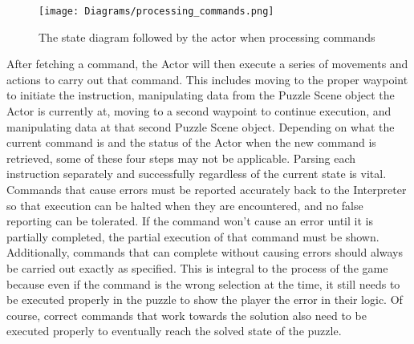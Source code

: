 \begin{figure}[!htb]
  \caption{The state diagram followed by the actor when processing commands}
  \label{fig:processing_commands}
  \centering
  \texttt{[image: Diagrams/processing\_commands.png]}
\end{figure}

After fetching a command, the Actor will then execute a series of movements and actions to carry out that command. This includes moving to the proper waypoint to initiate the instruction, manipulating data from the Puzzle Scene object the Actor is currently at, moving to a second waypoint to continue execution, and manipulating data at that second Puzzle Scene object. Depending on what the current command is and the status of the Actor when the new command is retrieved, some of these four steps may not be applicable. Parsing each instruction separately and successfully regardless of the current state is vital. Commands that cause errors must be reported accurately back to the Interpreter so that execution can be halted when they are encountered, and no false reporting can be tolerated. If the command won't cause an error until it is partially completed, the partial execution of that command must be shown. Additionally, commands that can complete without causing errors should always be carried out exactly as specified. This is integral to the process of the game because even if the command is the wrong selection at the time, it still needs to be executed properly in the puzzle to show the player the error in their logic. Of course, correct commands that work towards the solution also need to be executed properly to eventually reach the solved state of the puzzle.\\

